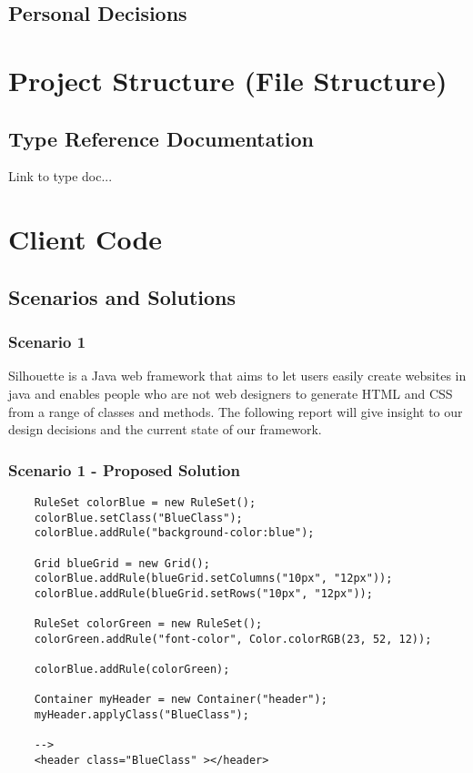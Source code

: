 \documentclass[12pt]{article}
\begin{document}
\subsection{Personal Decisions}

\section{Project Structure (File Structure)}

\subsection{Type Reference Documentation}
Link to type doc...

\section{Client Code}

\subsection{Scenarios and Solutions}

\subsubsection{Scenario 1}
Silhouette is a Java web framework that aims to let users easily create websites in java and enables people who are not web designers to generate HTML and CSS from a range of classes and methods. The following report will give insight to our design decisions and the current state of our framework.

\subsubsection{Scenario 1 - Proposed Solution}

\begin{lstlisting}
    RuleSet colorBlue = new RuleSet();
    colorBlue.setClass("BlueClass");
    colorBlue.addRule("background-color:blue");

    Grid blueGrid = new Grid();
    colorBlue.addRule(blueGrid.setColumns("10px", "12px"));
    colorBlue.addRule(blueGrid.setRows("10px", "12px"));

    RuleSet colorGreen = new RuleSet();
    colorGreen.addRule("font-color", Color.colorRGB(23, 52, 12));

    colorBlue.addRule(colorGreen);

    Container myHeader = new Container("header");
    myHeader.applyClass("BlueClass");

    -->
    <header class="BlueClass" ></header>
\end{lstlisting}
\end{document}
